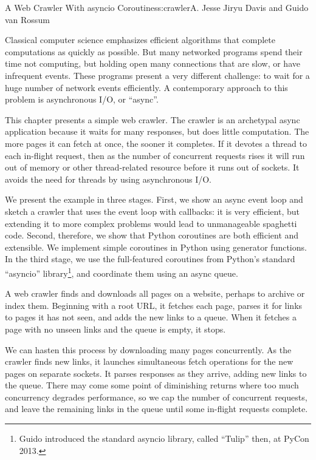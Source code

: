 \begin{aosachapter}{A Web Crawler With asyncio Coroutines}{s:crawler}{A. Jesse Jiryu Davis and Guido van Rossum}

\label{introduction}

Classical computer science emphasizes efficient algorithms that complete
computations as quickly as possible. But many networked programs spend
their time not computing, but holding open many connections that are
slow, or have infrequent events. These programs present a very different
challenge: to wait for a huge number of network events efficiently. A
contemporary approach to this problem is asynchronous I/O, or ``async''.

This chapter presents a simple web crawler. The crawler is an archetypal
async application because it waits for many responses, but does little
computation. The more pages it can fetch at once, the sooner it
completes. If it devotes a thread to each in-flight request, then as the
number of concurrent requests rises it will run out of memory or other
thread-related resource before it runs out of sockets. It avoids the
need for threads by using asynchronous I/O.

We present the example in three stages. First, we show an async event
loop and sketch a crawler that uses the event loop with callbacks: it is
very efficient, but extending it to more complex problems would lead to
unmanageable spaghetti code. Second, therefore, we show that Python
coroutines are both efficient and extensible. We implement simple
coroutines in Python using generator functions. In the third stage, we
use the full-featured coroutines from Python's standard ``asyncio''
library\footnote{Guido introduced the standard asyncio library, called
  ``Tulip'' then, at PyCon 2013.}, and coordinate them using an async
queue.

\label{the-task}

A web crawler finds and downloads all pages on a website, perhaps to
archive or index them. Beginning with a root URL, it fetches each page,
parses it for links to pages it has not seen, and adds the new links to
a queue. When it fetches a page with no unseen links and the queue is
empty, it stops.

We can hasten this process by downloading many pages concurrently. As
the crawler finds new links, it launches simultaneous fetch operations
for the new pages on separate sockets. It parses responses as they
arrive, adding new links to the queue. There may come some point of
diminishing returns where too much concurrency degrades performance, so
we cap the number of concurrent requests, and leave the remaining links
in the queue until some in-flight requests complete.


\end{aosachapter}
